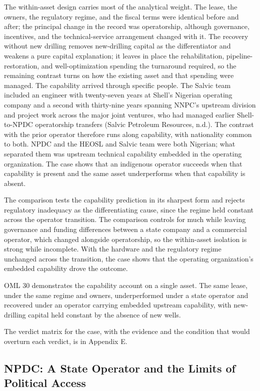 \documentclass[twoside,fontset=lmodern]{mitthesis}
\begin{document}
The within-asset design carries most of the analytical weight. The
lease, the owners, the regulatory regime, and the fiscal terms were
identical before and after; the principal change in the record was
operatorship, although governance, incentives, and the technical-service
arrangement changed with it. The recovery without new drilling removes
new-drilling capital as the differentiator and weakens a pure capital
explanation; it leaves in place the rehabilitation,
pipeline-restoration, and well-optimization spending the turnaround
required, so the remaining contrast turns on how the existing asset and
that spending were managed. The capability arrived through specific
people. The Salvic team included an engineer with twenty-seven years at
Shell's Nigerian operating company and a second with thirty-nine years
spanning NNPC's upstream division and project work across the major
joint ventures, who had managed earlier Shell-to-NPDC operatorship
transfers (Salvic Petroleum Resources, n.d.). The contrast with the
prior operator therefore runs along capability, with nationality common
to both. NPDC and the HEOSL and Salvic team were both Nigerian; what
separated them was upstream technical capability embedded in the
operating organization. The case shows that an indigenous operator
succeeds when that capability is present and the same asset
underperforms when that capability is absent.

The comparison tests the capability prediction in its sharpest form and
rejects regulatory inadequacy as the differentiating cause, since the
regime held constant across the operator transition. The comparison
controls for much while leaving governance and funding differences
between a state company and a commercial operator, which changed
alongside operatorship, so the within-asset isolation is strong while
incomplete. With the hardware and the regulatory regime unchanged across
the transition, the case shows that the operating organization's
embedded capability drove the outcome.

OML 30 demonstrates the capability account on a single asset. The same
lease, under the same regime and owners, underperformed under a state
operator and recovered under an operator carrying embedded upstream
capability, with new-drilling capital held constant by the absence of
new wells.

The verdict matrix for the case, with the evidence and the condition
that would overturn each verdict, is in Appendix E.

\hypertarget{npdc-a-state-operator-and-the-limits-of-political-access}{%
\subsection{NPDC: A State Operator and the Limits of Political
Access}\label{npdc-a-state-operator-and-the-limits-of-political-access}}
\end{document}
